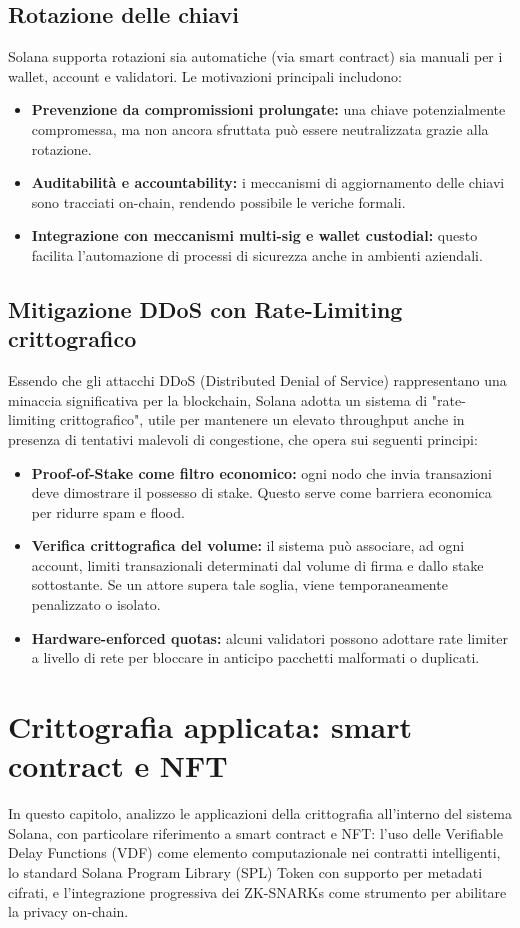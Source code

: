 \documentclass[a4paper,12pt]{report}
\begin{document}
	\section{Rotazione delle chiavi}
	Solana supporta rotazioni sia automatiche (via smart contract) sia manuali per i wallet, account e validatori. Le motivazioni principali includono:
	\begin{itemize}
		\item \textbf{Prevenzione da compromissioni prolungate:} una chiave potenzialmente compromessa, ma non ancora sfruttata può essere neutralizzata grazie alla rotazione.
		\item \textbf{Auditabilità e accountability:} i meccanismi di aggiornamento delle chiavi sono tracciati on-chain, rendendo possibile le veriche formali.
		\item \textbf{Integrazione con meccanismi multi-sig e wallet custodial:} questo facilita l'automazione di processi di sicurezza anche in ambienti aziendali.
	\end{itemize}
	
	\section{Mitigazione DDoS con Rate-Limiting crittografico}
	Essendo che gli attacchi DDoS (Distributed Denial of Service) rappresentano una minaccia significativa per la blockchain, Solana adotta un sistema di "rate-limiting crittografico", utile per mantenere un elevato throughput anche in presenza di tentativi malevoli di congestione, che opera sui seguenti principi:
	
	\begin{itemize}
		\item \textbf{Proof-of-Stake come filtro economico:} ogni nodo che invia transazioni deve dimostrare il possesso di stake. Questo serve come barriera economica per ridurre spam e flood.
		\item \textbf{Verifica crittografica del volume:} il sistema può associare, ad ogni account, limiti transazionali determinati dal volume di firma e dallo stake sottostante. Se un attore supera tale soglia, viene temporaneamente penalizzato o isolato.
		\item \textbf{Hardware-enforced quotas:} alcuni validatori possono adottare rate limiter a livello di rete per bloccare in anticipo pacchetti malformati o duplicati.
	\end{itemize}
	
	\chapter{Crittografia applicata: smart contract e NFT}
	In questo capitolo, analizzo le applicazioni della crittografia all'interno del sistema Solana, con particolare riferimento a smart contract e NFT: l'uso delle Verifiable Delay Functions (VDF) come elemento computazionale nei contratti intelligenti, lo standard Solana Program Library (SPL) Token con supporto per metadati cifrati, e l’integrazione progressiva dei ZK-SNARKs come strumento per abilitare la privacy on-chain.
	
\end{document}
